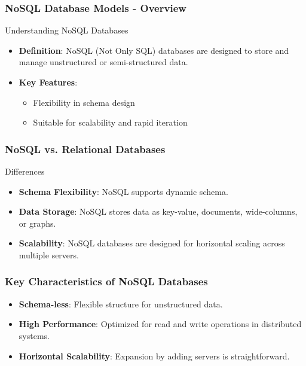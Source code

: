\documentclass[aspectratio=169]{beamer}
\begin{document}
\begin{frame}[fragile]
    \frametitle{NoSQL Database Models - Overview}
    \begin{block}{Understanding NoSQL Databases}
        \begin{itemize}
            \item \textbf{Definition}: NoSQL (Not Only SQL) databases are designed to store and manage unstructured or semi-structured data.
            \item \textbf{Key Features}:
                \begin{itemize}
                    \item Flexibility in schema design
                    \item Suitable for scalability and rapid iteration
                \end{itemize}
        \end{itemize}
    \end{block}
\end{frame}

\begin{frame}[fragile]
    \frametitle{NoSQL vs. Relational Databases}
    \begin{block}{Differences}
        \begin{itemize}
            \item \textbf{Schema Flexibility}: NoSQL supports dynamic schema.
            \item \textbf{Data Storage}: NoSQL stores data as key-value, documents, wide-columns, or graphs.
            \item \textbf{Scalability}: NoSQL databases are designed for horizontal scaling across multiple servers.
        \end{itemize}
    \end{block}
\end{frame}

\begin{frame}[fragile]
    \frametitle{Key Characteristics of NoSQL Databases}
    \begin{itemize}
        \item \textbf{Schema-less}: Flexible structure for unstructured data.
        \item \textbf{High Performance}: Optimized for read and write operations in distributed systems.
        \item \textbf{Horizontal Scalability}: Expansion by adding servers is straightforward.
    \end{itemize}
\end{frame}
\end{document}

